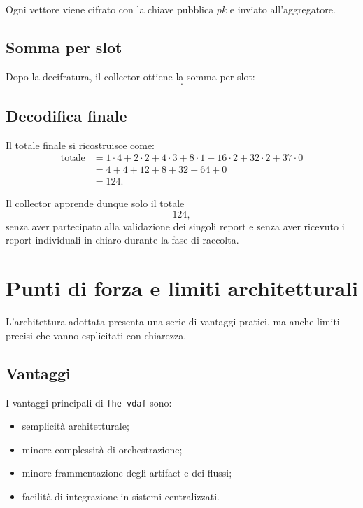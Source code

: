 Ogni vettore viene cifrato con la chiave pubblica $pk$ e inviato all'aggregatore.

\subsection{Somma per slot}
Dopo la decifratura, il collector ottiene la somma per slot:
\begin{equation}
[4,2,3,1,2,2,0].
\end{equation}

\subsection{Decodifica finale}
Il totale finale si ricostruisce come:
\begin{align}
\text{totale}
&= 1\cdot 4 + 2\cdot 2 + 4\cdot 3 + 8\cdot 1 + 16\cdot 2 + 32\cdot 2 + 37\cdot 0 \\
&= 4 + 4 + 12 + 8 + 32 + 64 + 0 \\
&= 124.
\end{align}

Il collector apprende dunque solo il totale
\begin{equation}
124,
\end{equation}
senza aver partecipato alla validazione dei singoli report e senza aver ricevuto i report individuali in chiaro durante la fase di raccolta.

\section{Punti di forza e limiti architetturali}
L'architettura adottata presenta una serie di vantaggi pratici, ma anche limiti precisi che vanno esplicitati con chiarezza.

\subsection{Vantaggi}
I vantaggi principali di \texttt{fhe-vdaf} sono:
\begin{itemize}
  \item semplicit\`a architetturale;
  \item minore complessit\`a di orchestrazione;
  \item minore frammentazione degli artifact e dei flussi;
  \item facilit\`a di integrazione in sistemi centralizzati.
\end{itemize}

